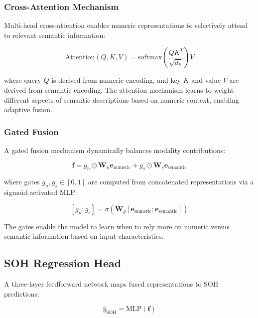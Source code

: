 \documentclass{sn-jnl}
\begin{document}
\subsubsection{Cross-Attention Mechanism}
\label{subsubsec:attention}

Multi-head cross-attention enables numeric representations to selectively attend to relevant semantic information:

\begin{equation}
\label{eq:attention}
    \text{Attention}(Q, K, V) = \text{softmax}\left(\frac{QK^T}{\sqrt{d_k}}\right)V
\end{equation}

where query $Q$ is derived from numeric encoding, and key $K$ and value $V$ are derived from semantic encoding. The attention mechanism learns to weight different aspects of semantic descriptions based on numeric context, enabling adaptive fusion.

\subsubsection{Gated Fusion}
\label{subsubsec:gating}

A gated fusion mechanism dynamically balances modality contributions:

\begin{equation}
\label{eq:gating}
    \mathbf{f} = g_n \odot \mathbf{W}_n \mathbf{e}_{\text{numeric}} + g_s \odot \mathbf{W}_s \mathbf{e}_{\text{semantic}}
\end{equation}

where gates $g_n, g_s \in [0,1]$ are computed from concatenated representations via a sigmoid-activated MLP:

\begin{equation}
\label{eq:gates}
    [g_n; g_s] = \sigma(\mathbf{W}_g [\mathbf{e}_{\text{numeric}}; \mathbf{e}_{\text{semantic}}])
\end{equation}

The gates enable the model to learn when to rely more on numeric versus semantic information based on input characteristics.

\subsection{SOH Regression Head}
\label{subsec:regression}

A three-layer feedforward network maps fused representations to SOH predictions:

\begin{equation}
\label{eq:mlp}
    \hat{y}_{\text{SOH}} = \text{MLP}(\mathbf{f})
\end{equation}
\end{document}
